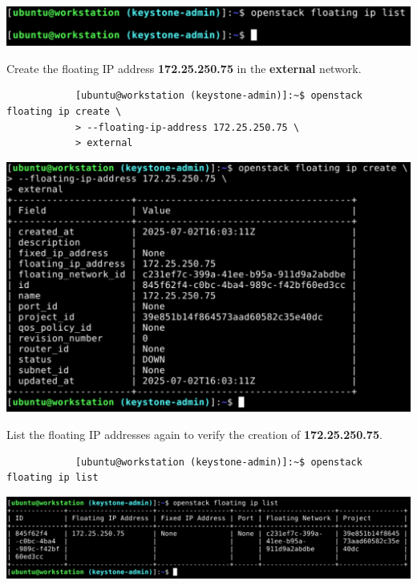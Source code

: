 \documentclass[letterpaper, 12pt]{article}
\begin{document}
\begin{enumerate}
\begin{labstep}
        \begin{center}
            \includegraphics[width=\linewidth]{images/part5/step19.png}
        \end{center}
    \end{labstep}

    \begin{labstep}
        Create the floating IP address \textbf{172.25.250.75} in the \textbf{external} network.
        \begin{lstlisting}
            [ubuntu@workstation (keystone-admin)]:~$ openstack floating ip create \
            > --floating-ip-address 172.25.250.75 \
            > external
        \end{lstlisting}

        \begin{center}
            \includegraphics[width=\linewidth]{images/part5/step20.png}
        \end{center}
    \end{labstep}

    \begin{labstep}
        List the floating IP addresses again to verify the creation of \textbf{172.25.250.75}.
        \begin{lstlisting}
            [ubuntu@workstation (keystone-admin)]:~$ openstack floating ip list
        \end{lstlisting}

        \begin{center}
            \includegraphics[width=\linewidth]{images/part5/step21.png}
        \end{center}
    \end{labstep}


\end{enumerate}
\end{document}

